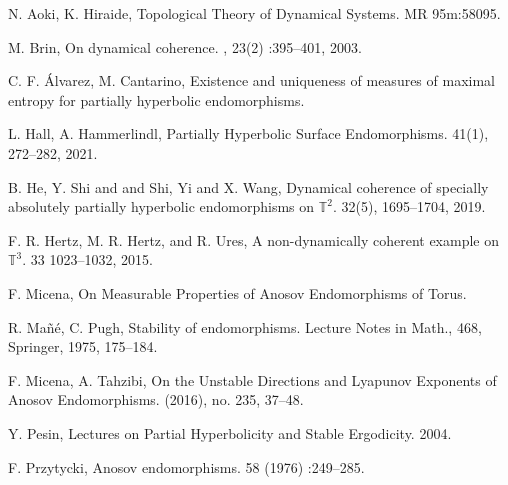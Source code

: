 \documentclass[12pt,reqno]{amsart}
\numberwithin{equation}{section}
\theoremstyle{plain}
\theoremstyle{remark}
\begin{document}
\begin{thebibliography}{RRRRRR}
N. Aoki, K. Hiraide,
\newblock Topological Theory of Dynamical Systems.
 MR 95m:58095.


M. Brin,
\newblock On dynamical coherence.
, 23(2) :395--401, 2003.


C. F. \'{A}lvarez, M. Cantarino,
\newblock Existence and uniqueness of measures of maximal entropy for partially hyperbolic endomorphisms.


L. Hall, A. Hammerlindl,
\newblock Partially Hyperbolic Surface Endomorphisms.
 41(1), 272--282, 2021.



B. He, Y. Shi and and Shi, Yi and X. Wang,
\newblock Dynamical coherence of specially absolutely partially hyperbolic endomorphisms on $\mathbb{T}^2.$
32(5), 1695--1704, 2019.

F. R. Hertz, M. R. Hertz, and R. Ures,
\newblock  A non-dynamically coherent example on $\mathbb{T}^3.$
33  1023--1032, 2015.

F. Micena,
\newblock On Measurable Properties of Anosov Endomorphisms of Torus.



R. Ma\~{n}\'{e}, C. Pugh,
\newblock Stability of endomorphisms.
 Lecture Notes in Math., 468, Springer, 1975,  175--184.

F. Micena, A. Tahzibi,
\newblock On the Unstable Directions and Lyapunov Exponents of Anosov Endomorphisms.
  (2016), no. 235, 37--48.

Y. Pesin,
\newblock Lectures on Partial Hyperbolicity and Stable Ergodicity.
 2004.

F. Przytycki,
\newblock Anosov endomorphisms.
 58 (1976) :249--285.



\end{thebibliography}
\end{document}
